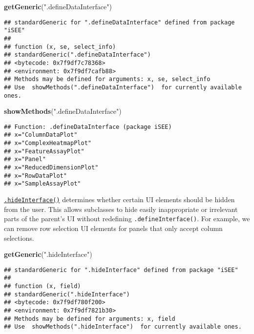 \documentclass[
]{book}
\newenvironment{Shaded}{\begin{snugshade}}{\end{snugshade}}
\newcommand{\KeywordTok}[1]{\textcolor[rgb]{0.13,0.29,0.53}{\textbf{#1}}}
\newcommand{\NormalTok}[1]{#1}
\newcommand{\StringTok}[1]{\textcolor[rgb]{0.31,0.60,0.02}{#1}}
\begin{document}
\begin{Shaded}
\begin{Highlighting}[]
\KeywordTok{getGeneric}\NormalTok{(}\StringTok{".defineDataInterface"}\NormalTok{)}
\end{Highlighting}
\end{Shaded}

\begin{verbatim}
## standardGeneric for ".defineDataInterface" defined from package "iSEE"
## 
## function (x, se, select_info) 
## standardGeneric(".defineDataInterface")
## <bytecode: 0x7f9df7c78368>
## <environment: 0x7f9df7cafb88>
## Methods may be defined for arguments: x, se, select_info
## Use  showMethods(".defineDataInterface")  for currently available ones.
\end{verbatim}

\begin{Shaded}
\begin{Highlighting}[]
\KeywordTok{showMethods}\NormalTok{(}\StringTok{".defineDataInterface"}\NormalTok{)}
\end{Highlighting}
\end{Shaded}

\begin{verbatim}
## Function: .defineDataInterface (package iSEE)
## x="ColumnDataPlot"
## x="ComplexHeatmapPlot"
## x="FeatureAssayPlot"
## x="Panel"
## x="ReducedDimensionPlot"
## x="RowDataPlot"
## x="SampleAssayPlot"
\end{verbatim}

\href{https://isee.github.io/iSEE/reference/interface-generics.html}{\texttt{.hideInterface()}} determines whether certain UI elements should be hidden from the user.
This allows subclasses to hide easily inappropriate or irrelevant parts of the parent's UI without redefining \texttt{.defineInterface()}.
For example, we can remove row selection UI elements for panels that only accept column selections.

\begin{Shaded}
\begin{Highlighting}[]
\KeywordTok{getGeneric}\NormalTok{(}\StringTok{".hideInterface"}\NormalTok{)}
\end{Highlighting}
\end{Shaded}

\begin{verbatim}
## standardGeneric for ".hideInterface" defined from package "iSEE"
## 
## function (x, field) 
## standardGeneric(".hideInterface")
## <bytecode: 0x7f9df780f200>
## <environment: 0x7f9df7821b30>
## Methods may be defined for arguments: x, field
## Use  showMethods(".hideInterface")  for currently available ones.
\end{verbatim}
\end{document}

